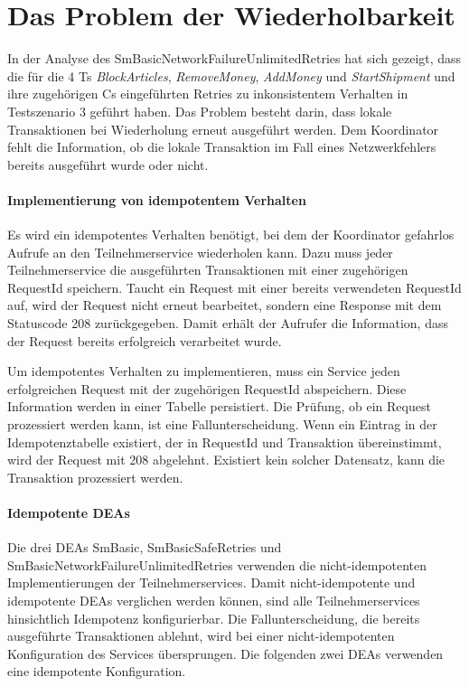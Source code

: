 \section{Das Problem der Wiederholbarkeit}

In der Analyse des SmBasicNetworkFailureUnlimitedRetries hat sich gezeigt, dass die für die 4 Ts \textit{BlockArticles}, \textit{RemoveMoney}, \textit{AddMoney} und \textit{StartShipment} und ihre zugehörigen Cs eingeführten Retries zu inkonsistentem Verhalten in Testszenario 3 geführt haben. Das Problem besteht darin, dass lokale Transaktionen bei Wiederholung erneut ausgeführt werden. Dem Koordinator fehlt die Information, ob die lokale Transaktion im Fall eines Netzwerkfehlers bereits ausgeführt wurde oder nicht. 

\paragraph*{Implementierung von idempotentem Verhalten}
Es wird ein idempotentes Verhalten benötigt, bei dem der Koordinator gefahrlos Aufrufe an den Teilnehmerservice wiederholen kann. Dazu muss jeder Teilnehmerservice die ausgeführten Transaktionen mit einer zugehörigen RequestId speichern. Taucht ein Request mit einer bereits verwendeten RequestId auf, wird der Request nicht erneut bearbeitet, sondern eine Response mit dem Statuscode 208 zurückgegeben. Damit erhält der Aufrufer die Information, dass der Request bereits erfolgreich verarbeitet wurde. 

Um idempotentes Verhalten zu implementieren, muss ein Service jeden erfolgreichen Request mit der zugehörigen RequestId abspeichern. Diese Information werden in einer Tabelle persistiert. Die Prüfung, ob ein Request prozessiert werden kann, ist eine Fallunterscheidung. Wenn ein Eintrag in der Idempotenztabelle existiert, der in RequestId und Transaktion übereinstimmt, wird der Request mit 208 abgelehnt. Existiert kein solcher Datensatz, kann die Transaktion prozessiert werden.

\paragraph*{Idempotente DEAs}
Die drei DEAs SmBasic, SmBasicSafeRetries und SmBasicNetworkFailureUnlimitedRetries verwenden die nicht-idempotenten Implementierungen der Teilnehmerservices. Damit nicht-idempotente und idempotente DEAs verglichen werden können, sind alle Teilnehmerservices hinsichtlich Idempotenz konfigurierbar. Die Fallunterscheidung, die bereits ausgeführte Transaktionen ablehnt, wird bei einer nicht-idempotenten Konfiguration des Services übersprungen. Die folgenden zwei DEAs verwenden eine idempotente Konfiguration. 